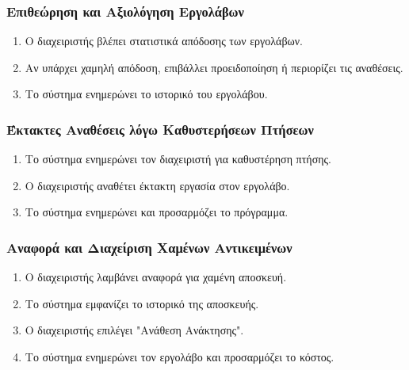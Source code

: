 \documentclass{article}
\begin{document}
\subsubsection{Επιθεώρηση και Αξιολόγηση Εργολάβων}
\begin{enumerate}
	\item Ο διαχειριστής βλέπει στατιστικά απόδοσης των εργολάβων.
	\item Αν υπάρχει χαμηλή απόδοση, επιβάλλει προειδοποίηση ή περιορίζει τις αναθέσεις.
	\item Το σύστημα ενημερώνει το ιστορικό του εργολάβου.
\end{enumerate}

\subsubsection{Έκτακτες Αναθέσεις λόγω Καθυστερήσεων Πτήσεων}
\begin{enumerate}
	\item Το σύστημα ενημερώνει τον διαχειριστή για καθυστέρηση πτήσης.
	\item Ο διαχειριστής αναθέτει έκτακτη εργασία στον εργολάβο.
	\item Το σύστημα ενημερώνει και προσαρμόζει το πρόγραμμα.
\end{enumerate}

\subsubsection{Αναφορά και Διαχείριση Χαμένων Αντικειμένων}
\begin{enumerate}
	\item Ο διαχειριστής λαμβάνει αναφορά για χαμένη αποσκευή.
	\item Το σύστημα εμφανίζει το ιστορικό της αποσκευής.
	\item Ο διαχειριστής επιλέγει "Ανάθεση Ανάκτησης".
	\item Το σύστημα ενημερώνει τον εργολάβο και προσαρμόζει το κόστος.
\end{enumerate}
\end{document}

